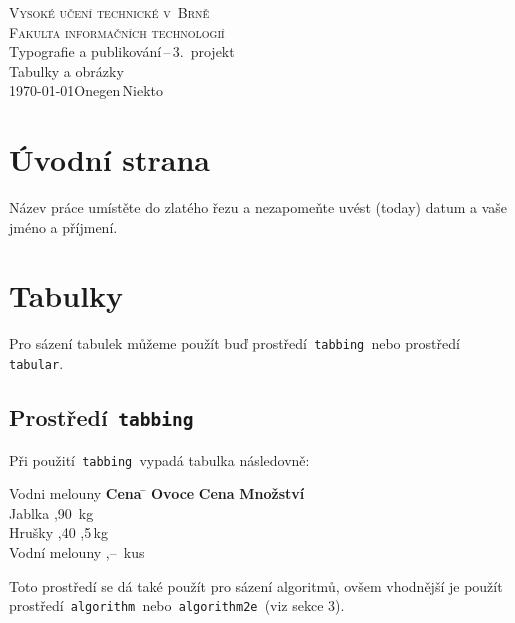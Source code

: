 \documentclass[a4paper, 11pt]{article}
\begin{document}
\begin{titlepage}
	\begin{center}
		{\Huge \textsc{Vysoké učení technické v~Brně}\\}
		{\huge \textsc{Fakulta informačních technologií}\\}
		{\LARGE Typografie a publikování\,--\,3.\ projekt\\}
		{\Huge Tabulky a obrázky\\}
		{\Large \today \hfill Onegen\,Niekto}
	\end{center}
\end{titlepage}

\section{Úvodní strana}

Název práce umístěte do zlatého řezu a nezapomeňte uvést  (today)
datum a vaše jméno a příjmení.

\section{Tabulky}

Pro sázení tabulek m\r{u}žeme použít buď prostředí\texttt{ tabbing }nebo
prostředí\texttt{ tabular}.

\subsection{Prostředí\texttt{ tabbing}}

Při použití\texttt{ tabbing }vypadá tabulka následovně:

\begin{tabbing}
	Vodni melouny \quad  \= \textbf{Cena} \quad \=                \kill
	\textbf{Ovoce}       \> \textbf{Cena}       \> \textbf{Množství} \\
	Jablka               ,90               \,kg             \\
	Hrušky               ,40               ,5\,kg           \\
	Vodní melouny        ,--               \,kus            \\
\end{tabbing}

\noindent
Toto prostředí se dá také použít pro sázení algoritm\r{u}, ovšem vhodnější je
použít prostředí\texttt{ algorithm }nebo\texttt{ algorithm2e }(viz sekce
3).
\end{document}
